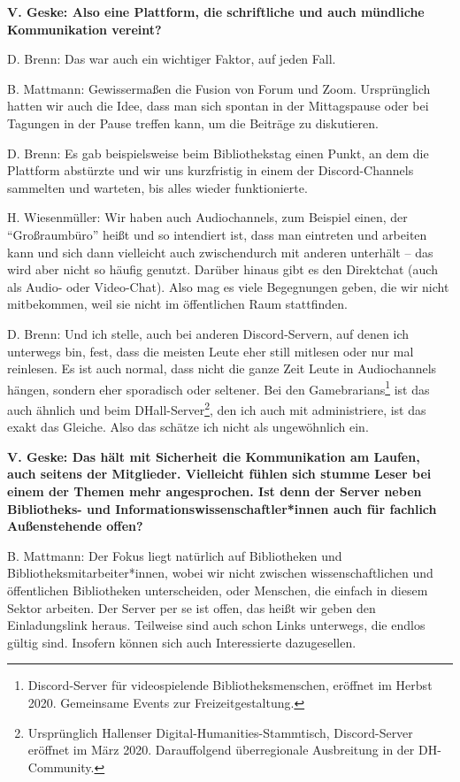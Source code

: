 \documentclass[a4paper,
fontsize=11pt,
oneside,
numbers=noperiodatend,
parskip=half-,
bibliography=totoc,
final
]{scrartcl}
\begin{document}
\textbf{V. Geske: Also eine Plattform, die schriftliche und auch
mündliche Kommunikation vereint?}

D. Brenn: Das war auch ein wichtiger Faktor, auf jeden Fall.

B. Mattmann: Gewissermaßen die Fusion von Forum und Zoom. Ursprünglich
hatten wir auch die Idee, dass man sich spontan in der Mittagspause oder
bei Tagungen in der Pause treffen kann, um die Beiträge zu diskutieren.

D. Brenn: Es gab beispielsweise beim Bibliothekstag einen Punkt, an dem
die Plattform abstürzte und wir uns kurzfristig in einem der
Discord-Channels sammelten und warteten, bis alles wieder funktionierte.

H. Wiesenmüller: Wir haben auch Audiochannels, zum Beispiel einen, der
\enquote{Großraumbüro} heißt und so intendiert ist, dass man eintreten
und arbeiten kann und sich dann vielleicht auch zwischendurch mit
anderen unterhält -- das wird aber nicht so häufig genutzt. Darüber
hinaus gibt es den Direktchat (auch als Audio- oder Video-Chat). Also
mag es viele Begegnungen geben, die wir nicht mitbekommen, weil sie
nicht im öffentlichen Raum stattfinden.

D. Brenn: Und ich stelle, auch bei anderen Discord-Servern, auf denen
ich unterwegs bin, fest, dass die meisten Leute eher still mitlesen oder
nur mal reinlesen. Es ist auch normal, dass nicht die ganze Zeit Leute
in Audiochannels hängen, sondern eher sporadisch oder seltener. Bei den
Gamebrarians\footnote{Discord-Server für videospielende
  Bibliotheksmenschen, eröffnet im Herbst 2020. Gemeinsame Events zur
  Freizeitgestaltung.} ist das auch ähnlich und beim
DHall-Server\footnote{Ursprünglich Hallenser
  Digital-Humanities-Stammtisch, Discord-Server eröffnet im März 2020.
  Darauffolgend überregionale Ausbreitung in der DH-Community.}, den ich
auch mit administriere, ist das exakt das Gleiche. Also das schätze ich
nicht als ungewöhnlich ein.

\textbf{V. Geske: Das hält mit Sicherheit die Kommunikation am Laufen,
auch seitens der Mitglieder. Vielleicht fühlen sich stumme Leser bei
einem der Themen mehr angesprochen. Ist denn der Server neben
Bibliotheks- und Informationswissenschaftler*innen auch für fachlich
Außenstehende offen?}

B. Mattmann: Der Fokus liegt natürlich auf Bibliotheken und
Bibliotheksmitarbeiter*innen, wobei wir nicht zwischen
wissenschaftlichen und öffentlichen Bibliotheken unterscheiden, oder
Menschen, die einfach in diesem Sektor arbeiten. Der Server per se ist
offen, das heißt wir geben den Einladungslink heraus. Teilweise sind
auch schon Links unterwegs, die endlos gültig sind. Insofern können sich
auch Interessierte dazugesellen.
\end{document}
